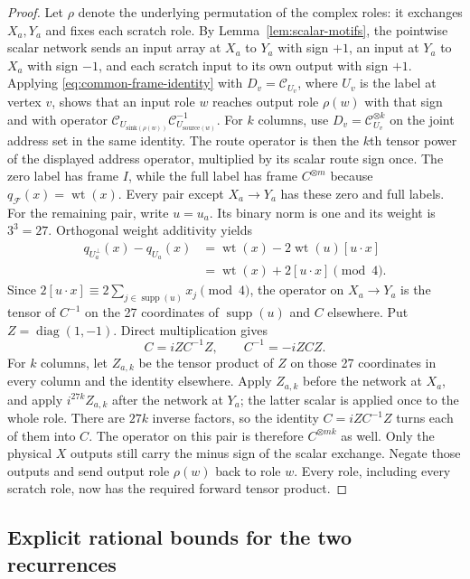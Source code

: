 \documentclass[11pt]{article}
\theoremstyle{definition}
\begin{document}
\begin{proof}
Let $\rho$ denote the underlying permutation of the complex roles: it
exchanges $X_a,Y_a$ and fixes each scratch role.
By Lemma~\ref{lem:scalar-motifs}, the pointwise scalar network sends an input array at
$X_a$ to $Y_a$ with sign $+1$, an input at $Y_a$ to $X_a$ with sign
$-1$, and each scratch input to its own output with sign $+1$.
Applying \eqref{eq:common-frame-identity} with $D_v=\mathcal C_{U_v}$,
where $U_v$ is the label at vertex $v$, shows that an input role $w$ reaches
output role $\rho(w)$ with that sign and with operator
$\mathcal C_{U_{\mathrm{sink}(\rho(w))}}
 \mathcal C_{U_{\mathrm{source}(w)}}^{-1}$.
For $k$ columns, use $D_v=\mathcal C_{U_v}^{\otimes k}$ on the joint
address set in the same identity.  The route operator is then the $k$th
tensor power of the displayed address operator, multiplied by its scalar
route sign once.
The zero label has frame $I$, while the full label has frame
$C^{\otimes m}$ because $q_{\mathcal F}(x)=\operatorname{wt}(x)$.
Every pair except $X_a\to Y_a$ has these zero and full labels.
For the remaining pair, write $u=u_a$.  Its binary norm is one and
its weight is $3^3=27$.  Orthogonal weight additivity yields
\begin{align*}
 q_{U_a^\perp}(x)-q_{U_a}(x)
 &=\operatorname{wt}(x)-2\operatorname{wt}(u)[u\cdot x]\\
 &=\operatorname{wt}(x)+2[u\cdot x]\pmod4.
\end{align*}
Since $2[u\cdot x]\equiv2\sum_{j\in\operatorname{supp}(u)}x_j
\pmod4$, the operator on $X_a\to Y_a$ is the tensor of $C^{-1}$ on the
27 coordinates of $\operatorname{supp}(u)$ and $C$ elsewhere.
Put $Z=\operatorname{diag}(1,-1)$.  Direct multiplication gives
\[
 C=iZC^{-1}Z,\qquad C^{-1}=-iZCZ.
\]
For $k$ columns, let $Z_{a,k}$ be the tensor product of $Z$ on
those 27 coordinates in every column and the identity elsewhere.
Apply $Z_{a,k}$ before the network at $X_a$, and apply
$i^{27k}Z_{a,k}$ after the network at $Y_a$; the latter scalar is
applied once to the whole role.  There are $27k$ inverse factors, so
the identity $C=iZC^{-1}Z$ turns each of them into $C$.  The operator
on this pair is therefore $C^{\otimes mk}$ as well.
Only the physical $X$ outputs still carry the minus sign of the
scalar exchange.  Negate those outputs and send output role $\rho(w)$
back to role $w$.  Every role, including every scratch role, now has
the required forward tensor product.
\end{proof}

\subsection{Explicit rational bounds for the two recurrences}
\end{document}
